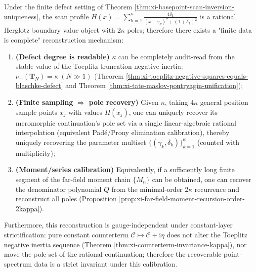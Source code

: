 \begin{corollary}\label{cor:xi-finite-defect-complete-reconstruction}
Under the finite defect setting of Theorem \ref{thm:xi-basepoint-scan-inversion-uniqueness}, the scan profile
\(
H(x)=\sum_{k=1}^{\kappa}\frac{4\delta_k}{(x-\gamma_k)^2+(1+\delta_k)^2}
\)
is a rational Herglotz boundary value object with \(2\kappa\) poles; therefore there exists a "finite data is complete" reconstruction mechanism:
\begin{enumerate}
  \item \textbf{(Defect degree is readable)} \(\kappa\) can be completely audit-read from the stable value of the Toeplitz truncation negative inertia:
  \(
  \nu_-(\mathbf{T}_N)=\kappa\ (N\gg 1)
  \)
  (Theorem \ref{thm:xi-toeplitz-negative-squares-equals-blaschke-defect} and Theorem \ref{thm:xi-tate-maslov-pontryagin-unification});
  \item \textbf{(Finite sampling \(\Rightarrow\) pole recovery)} Given \(\kappa\), taking \(4\kappa\) general position sample points \(x_j\) with values \(H(x_j)\), one can uniquely recover its meromorphic continuation's pole set via a single linear-algebraic rational interpolation (equivalent Pad\'e/Prony elimination calibration), thereby uniquely recovering the parameter multiset \(\{(\gamma_k,\delta_k)\}_{k=1}^{\kappa}\) (counted with multiplicity);
  \item \textbf{(Moment/series calibration)} Equivalently, if a sufficiently long finite segment of the far-field moment chain \(\{M_n\}\) can be obtained, one can recover the denominator polynomial \(Q\) from the minimal-order \(2\kappa\) recurrence and reconstruct all poles (Proposition \ref{prop:xi-far-field-moment-recursion-order-2kappa}).
\end{enumerate}
Furthermore, this reconstruction is gauge-independent under constant-layer strictification: pure constant counterterm \(\mathscr{C}\mapsto \mathscr{C}+\mathrm{i}\eta\) does not alter the Toeplitz negative inertia sequence (Theorem \ref{thm:xi-counterterm-invariance-kappa}), nor move the pole set of the rational continuation; therefore the recoverable point-spectrum data is a strict invariant under this calibration.
\end{corollary}
